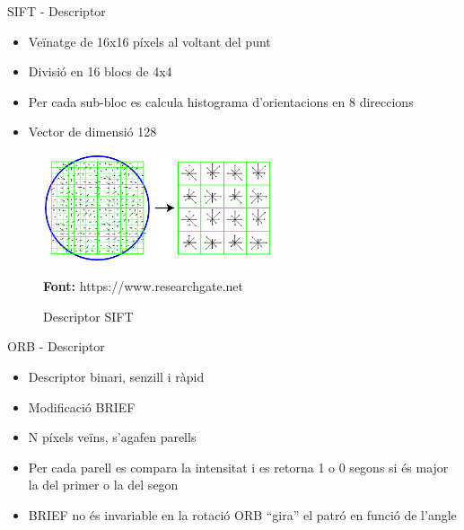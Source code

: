 \documentclass[xcolor=table, 11pt]{beamer}
\newcommand*{\captionsource}[2]{%
  \caption[{#1}]{#1}\par
  \vspace{-0.4cm}
  \tiny{\textbf{Font:} #2\par}}
\newcommand\tz{\fontsize{13}{15.6}\selectfont}
\begin{document}
	\begin{frame}{SIFT - Descriptor}
		\tz
		\begin{itemize}
			\item Veïnatge de 16x16 píxels al voltant del punt
			\item Divisió en 16 blocs de 4x4
			\item Per cada sub-bloc es calcula histograma d'orientacions en 8 direccions
			\item Vector de dimensió 128
		\end{itemize}
		\begin{figure}[H]
			\centering
			\includegraphics[width=0.6\textwidth]{images/sift-des}
			\captionsource{Descriptor SIFT}{https://www.researchgate.net}
		\end{figure}
	\end{frame}

	\begin{frame}{ORB - Descriptor}
		\tz
		\begin{itemize}
			\item Descriptor binari, senzill i ràpid
			\item Modificació BRIEF\cite{Calonder:2010:BBR:1888089.1888148}
			\item N píxels veïns, s'agafen parells
			\item Per cada parell es compara la intensitat i es retorna 1 o 0 segons si és major la del primer o la del segon
			\item \alert{BRIEF no és invariable en la rotació} \textrightarrow{} ORB ``gira'' el patró en funció de l'angle
		\end{itemize}
	\end{frame}
\end{document}
